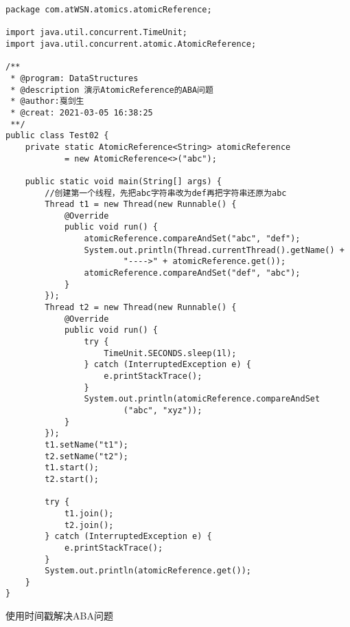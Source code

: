 \documentclass[a4paper]{report}
\begin{document}
\begin{Verbatim}[frame=single,numbersep=5pt,xleftmargin=1.5em,xrightmargin=1.5em]
package com.atWSN.atomics.atomicReference;

import java.util.concurrent.TimeUnit;
import java.util.concurrent.atomic.AtomicReference;

/**
 * @program: DataStructures
 * @description 演示AtomicReference的ABA问题
 * @author:戛剑生
 * @creat: 2021-03-05 16:38:25
 **/
public class Test02 {
    private static AtomicReference<String> atomicReference
            = new AtomicReference<>("abc");

    public static void main(String[] args) {
        //创建第一个线程，先把abc字符串改为def再把字符串还原为abc
        Thread t1 = new Thread(new Runnable() {
            @Override
            public void run() {
                atomicReference.compareAndSet("abc", "def");
                System.out.println(Thread.currentThread().getName() +
                        "---->" + atomicReference.get());
                atomicReference.compareAndSet("def", "abc");
            }
        });
        Thread t2 = new Thread(new Runnable() {
            @Override
            public void run() {
                try {
                    TimeUnit.SECONDS.sleep(1l);
                } catch (InterruptedException e) {
                    e.printStackTrace();
                }
                System.out.println(atomicReference.compareAndSet
                        ("abc", "xyz"));
            }
        });
        t1.setName("t1");
        t2.setName("t2");
        t1.start();
        t2.start();

        try {
            t1.join();
            t2.join();
        } catch (InterruptedException e) {
            e.printStackTrace();
        }
        System.out.println(atomicReference.get());
    }
}
\end{Verbatim}

使用时间戳解决ABA问题
\end{document}
